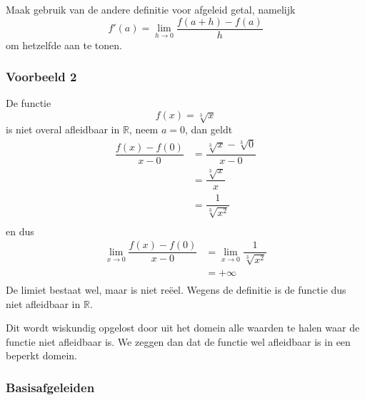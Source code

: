 \documentclass[12pt]{article}
\begin{document}
\begin{oefening}
  Maak gebruik van de andere definitie voor afgeleid getal, namelijk $$f'(a)=\lim_{h\to 0}\dfrac{f(a+h)-f(a)}{h}$$ om hetzelfde aan te tonen.
\end{oefening}

\subsubsection*{Voorbeeld 2}

De functie
$$f(x)=\sqrt[3]{x}$$
is niet overal afleidbaar in $\mathbb{R}$, neem $a=0$, dan geldt
\begin{align*}
  \dfrac{f(x)-f(0)}{x-0} &= \dfrac{\sqrt[3]{x}-\sqrt[3]{0}}{x-0}\\
                         &= \dfrac{\sqrt[3]{x}}{x}\\
                         &= \dfrac{1}{\sqrt[3]{x^2}}\\
\end{align*}
en dus
\begin{align*}
  \lim_{x\to 0}\dfrac{f(x)-f(0)}{x-0} &= \lim_{x\to 0}\dfrac{1}{\sqrt[3]{x^2}}\\
                                      &= +\infty\\
\end{align*}
De limiet bestaat wel, maar is niet reëel. Wegens de definitie is de functie dus niet afleidbaar in $\mathbb{R}$.

Dit wordt wiskundig opgelost door uit het domein alle waarden te halen waar de functie niet afleidbaar is. We zeggen dan dat de functie wel afleidbaar is in een beperkt domein.

\subsubsection*{Basisafgeleiden}
\end{document}

